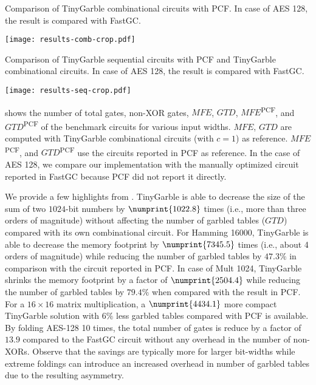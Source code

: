 \begin{table*}
\centering
\caption{Comparison of TinyGarble combinational circuits with PCF.
In case of AES 128, the result is compared with FastGC.}
\label{table:result-comb}
\texttt{[image: results-comb-crop.pdf]}
\end{table*}

\begin{table*}
\centering
\caption{Comparison of TinyGarble sequential circuits with PCF and TinyGarble combinational circuits.
In case of AES 128, the result is compared with FastGC.}
\label{table:result-seq}
\texttt{[image: results-seq-crop.pdf]}
\end{table*}

 shows the number of total gates, non-XOR gates, $\mathit{MFE}$, $\mathit{GTD}$, $\mathit{MFE}$\textsuperscript{PCF}, and $\mathit{GTD}$\textsuperscript{PCF} of the benchmark circuits for various input widths.
$\mathit{MFE}$, $\mathit{GTD}$ are computed with TinyGarble combinational circuits (with $c=1$) as reference.
$\mathit{MFE}$\textsuperscript{PCF}, and $\mathit{GTD}$\textsuperscript{PCF} use the circuits reported in PCF as reference.
In the case of AES 128, we compare our implementation with the manually optimized circuit reported in FastGC \cite{huang2011faster} because PCF did not report it directly.

We provide a few highlights from .
TinyGarble is able to decrease the size of the sum of two $1024$-bit numbers by $\numprint{1022.8}$ times (i.e., more than three orders of magnitude) without affecting the number of garbled tables ($\mathit{GTD}$) compared with its own combinational circuit.
For Hamming 16000, TinyGarble is able to decrease the memory footprint by $\numprint{7345.5}$ times (i.e., about 4 orders of magnitude) while reducing the number of garbled tables by $47.3\%$ in comparison with the circuit reported in PCF.
In case of Mult 1024, TinyGarble shrinks the memory footprint by a factor of $\numprint{2504.4}$ while reducing the number of garbled tables by $79.4\%$ when compared with the result in PCF.
For a $16\times 16$ matrix multiplication, a $\numprint{4434.1}$ more compact TinyGarble solution with $6\%$ less garbled tables compared with PCF is available.
By folding AES-128 10 times, the total number of gates is reduce by a factor of $13.9$ compared to the  FastGC circuit without any overhead in the number of non-XORs.
Observe that the savings are typically more for larger bit-widths while extreme foldings can introduce an increased overhead in number of garbled tables due to the resulting asymmetry.

